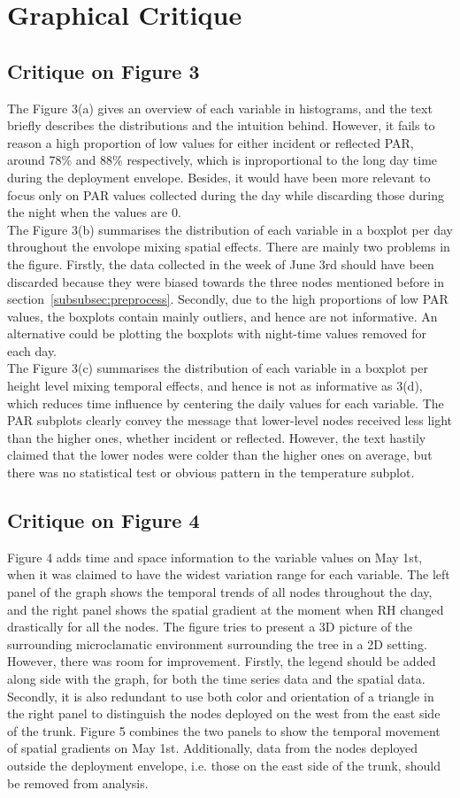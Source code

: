 \documentclass[11pt]{article}
\begin{document}
\section{Graphical Critique}
\subsection{Critique on Figure 3}
The Figure 3(a) gives an overview of each variable in histograms, and the text briefly describes the distributions and the intuition behind. However, it fails to reason a high proportion of low values for either incident or reflected PAR, around 78\% and 88\% respectively, which is inproportional to the long day time during the deployment envelope. Besides, it would have been more relevant to focus only on PAR values collected during the day while discarding those during the night when the values are 0.\\
The Figure 3(b) summarises the distribution of each variable in a boxplot per day throughout the envolope mixing spatial effects. There are mainly two problems in the figure. Firstly, the data collected in the week of June 3rd should have been discarded because they were biased towards the three nodes mentioned before in section~\ref{subsubsec:preprocess}. Secondly, due to the high proportions of low PAR values, the boxplots contain mainly outliers, and hence are not informative. An alternative could be plotting the boxplots with night-time values removed for each day.\\
The Figure 3(c) summarises the distribution of each variable in a boxplot per height level mixing temporal effects, and hence is not as informative as 3(d), which reduces time influence by centering the daily values for each variable. The PAR subplots clearly convey the message that lower-level nodes received less light than the higher ones, whether incident or reflected. However, the text hastily claimed that the lower nodes were colder than the higher ones on average, but there was no statistical test or obvious pattern in the temperature subplot.  
\subsection{Critique on Figure 4}
Figure 4 adds time and space information to the variable values on May 1st, when it was claimed to have the widest variation range for each variable. The left panel of the graph shows the temporal trends of all nodes throughout the day, and the right panel shows the spatial gradient at the moment when RH changed drastically for all the nodes. The figure tries to present a 3D picture of the surrounding microclamatic environment surrounding the tree in a 2D setting. However, there was room for improvement. Firstly, the legend should be added along side with the graph, for both the time series data and the spatial data. Secondly, it is also redundant to use both color and orientation of a triangle in the right panel to distinguish the nodes deployed on the west from the east side of the trunk. Figure 5 combines the two panels to show the temporal movement of spatial gradients on May 1st. Additionally, data from the nodes deployed outside the deployment envelope, i.e. those on the east side of the trunk, should be removed from analysis.
\end{document}
